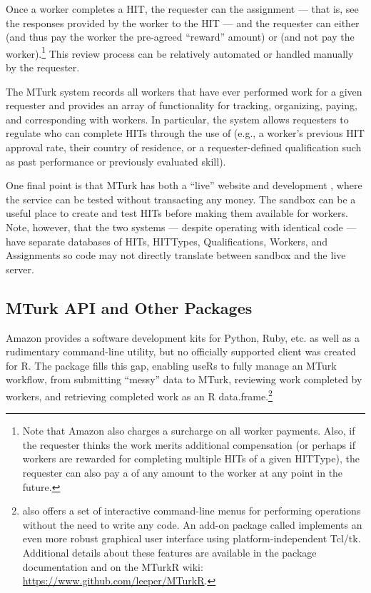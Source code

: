 Once a worker completes a HIT, the requester can  the assignment --- that is, see the responses provided by the worker to the HIT --- and the requester can either  (and thus pay the worker the pre-agreed ``reward'' amount) or  (and not pay the worker).\footnote{Note that Amazon also charges a surcharge on all worker payments. Also, if the requester thinks the work merits additional compensation (or perhaps if workers are rewarded for completing multiple HITs of a given HITType), the requester can also pay a  of any amount to the worker at any point in the future.} This review process can be relatively automated or handled manually by the requester.

The MTurk system records all workers that have ever performed work for a given requester and provides an array of functionality for tracking, organizing, paying, and corresponding with workers. In particular, the system allows requesters to regulate who can complete HITs through the use of  (e.g., a worker's previous HIT approval rate, their country of residence, or a requester-defined qualification such as past performance or previously evaluated skill).

One final point is that MTurk has both a ``live'' website and development , where the service can be tested without transacting any money. The sandbox can be a useful place to create and test HITs before making them available for workers. Note, however, that the two systems --- despite operating with identical code --- have separate databases of HITs, HITTypes, Qualifications, Workers, and Assignments so code may not directly translate between sandbox and the live server.

\subsection{MTurk API and Other Packages}
Amazon provides a software development kits for Python, Ruby, etc. as well as a rudimentary command-line utility, but no officially supported client was created for R. The  package fills this gap, enabling useRs to fully manage an MTurk workflow, from submitting ``messy'' data to MTurk, reviewing work completed by workers, and retrieving completed work as an R data.frame.\footnote{ also offers a set of interactive command-line menus for performing  operations without the need to write any code. An add-on package called  implements an even more robust graphical user interface using platform-independent Tcl/tk. Additional details about these  features are available in the package documentation and on the MTurkR wiki: \url{https://www.github.com/leeper/MTurkR}.}

